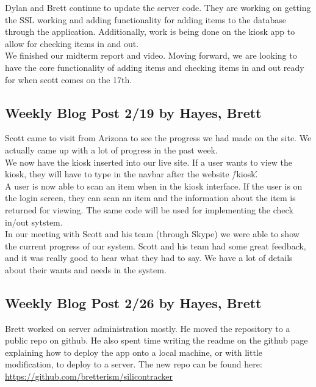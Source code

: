 \documentclass[10pt, onecolumn, twoside, peerreview]{IEEEtran}
\begin{document}
Dylan and Brett continue to update the server code. They are working on getting the SSL working and adding functionality for adding items to the database through the application. Additionally, work is being done on the kiosk app to allow for checking items in and out.\\

We finished our midterm report and video. Moving forward, we are looking to have the core functionality of adding items and checking items in and out ready for when scott comes on the 17th.

\subsection{Weekly Blog Post 2/19 by Hayes, Brett}
Scott came to visit from Arizona to see the progress we had made on the site. We actually came up with a lot of progress in the past week.\\

We now have the kiosk inserted into our live site. If a user wants to view the kiosk, they will have to type in the navbar after the website \'/kiosk\'.\\

A user is now able to scan an item when in the kiosk interface. If the user is on the login screen, they can scan an item and the information about the item is returned for viewing. The same code will be used for implementing the check in/out sytstem.\\

In our meeting with Scott and his team (through Skype) we were able to show the current progress of our system. Scott and his team had some great feedback, and it was really good to hear what they had to say. We have a lot of details about their wants and needs in the system.​

\subsection{Weekly Blog Post 2/26 by Hayes, Brett}
Brett worked on server administration mostly. He moved the repository to a public repo on github. He also spent time writing the readme on the github page explaining how to deploy the app onto a local machine, or with little modification, to deploy to a server. The new repo can be found here: \\

\url{https://github.com/bretterism/silicontracker​}\\
\end{document}
